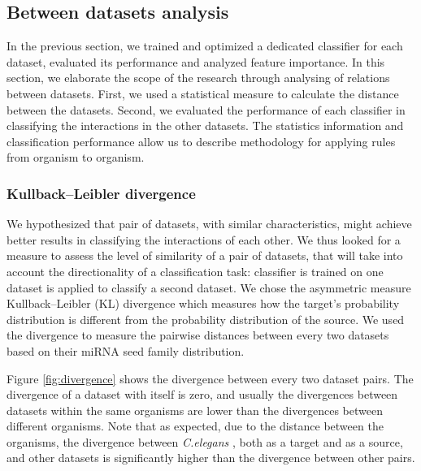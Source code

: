 \documentclass{bmcart}
\begin{document}
\subsection*{Between datasets analysis}
In the previous section, we trained and optimized a dedicated classifier for each dataset, evaluated its performance and analyzed feature importance.
In this section, we elaborate the scope of the research through analysing of relations between datasets. 
First, we used a statistical measure to calculate the distance between the datasets. Second, we evaluated the performance of each classifier in classifying the interactions in the other datasets. 
The statistics information and classification performance allow us to describe methodology for applying rules from organism to organism.

\subsubsection*{Kullback–Leibler divergence}
We hypothesized that pair of datasets, with similar characteristics, might achieve better results in classifying the interactions of each other. We thus looked for a measure to assess the level of similarity of a pair of datasets, that will take into account the directionality of a classification task: classifier is trained on one dataset is applied to classify a second dataset.
We chose the asymmetric measure Kullback–Leibler (KL) divergence which measures how the target's probability distribution is different from the  probability distribution of the source. We used the divergence to measure the pairwise distances between every two datasets based on their miRNA seed family distribution.


Figure \ref{fig:divergence} shows the divergence between every two dataset pairs. The divergence of a dataset with itself is zero, and usually the divergences between datasets within the same organisms are lower than the divergences between different organisms. Note that as expected, due to the distance between the organisms, the divergence between \textit{C.elegans }, both as a target and as a source, and other datasets is significantly higher than the divergence between other pairs.
\end{document}
